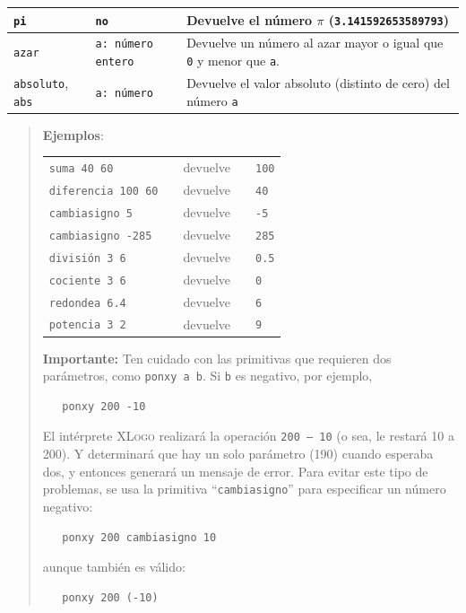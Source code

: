 \begin{center}
\begin{longtable}{|m{3cm}|m{2.6cm}|m{9cm}|}
   \texttt{pi} \index{pi@\texttt{pi}} & \texttt{no} & 
      Devuelve el n\'umero $\pi$ \index{$\pi$} (\texttt{3.141592653589793})
                      \\ \hline 
   \texttt{azar} \index{azar@\texttt{azar}} & \texttt{a: n\'umero entero} &
      Devuelve un n\'umero al azar mayor o igual que \texttt{0} y 
      menor que \texttt{a}.\\ \hline 
   \texttt{absoluto}, \index{absoluto@\texttt{absoluto}} 
      \texttt{abs} \index{absoluto@\texttt{abs}} & \texttt{a: n\'umero} &
        Devuelve el valor absoluto \index{Valor absoluto} (distinto de cero)
        del n\'umero \texttt{a}\\ \hline
\end{longtable} \end{center}

\begin{quote}
\noindent \textbf{Ejemplos}:

\begin{longtable}{lcccl}
   \texttt{suma 40 60}        & & devuelve & & \texttt{100} \\
   \texttt{diferencia 100 60} & & devuelve & & \texttt{40}  \\
   \texttt{cambiasigno 5}     & & devuelve & & \texttt{-5}  \\
   \texttt{cambiasigno -285}  & & devuelve & & \texttt{285} \\
   \texttt{divisi\'on 3 6}      & & devuelve & & \texttt{0.5} \\
   \texttt{cociente 3 6}      & & devuelve & & \texttt{0}   \\
   \texttt{redondea 6.4}      & & devuelve & & \texttt{6}   \\
   \texttt{potencia 3 2}      & & devuelve & & \texttt{9} 
\end{longtable}

\noindent \textbf{Importante:} Ten cuidado con las primitivas que
requieren dos par\'ametros, como \texttt{ponxy a b}. Si \texttt{b} es
negativo, por ejemplo,
\begin{verbatim}
   ponxy 200 -10 \end{verbatim}
El int\'erprete \textsc{XLogo} realizar\'a la operaci\'on \texttt{200 -- 10}
(o sea, le restar\'a 10 a 200). Y determinar\'a que hay un solo par\'ametro
(190) cuando esperaba dos, y entonces generar\'a un mensaje de error.
Para evitar este tipo de problemas, se usa la primitiva 
``\texttt{cambiasigno}'' para especificar un n\'umero negativo: 
\begin{verbatim}
   ponxy 200 cambiasigno 10 \end{verbatim}
aunque tambi\'en es v\'alido:
\begin{verbatim}
   ponxy 200 (-10) \end{verbatim}
\end{quote}

